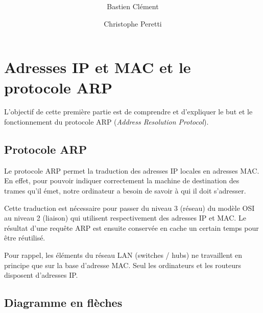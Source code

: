 \documentclass[11pt,a4paper]{article}
\author{Bastien Clément \and Christophe Peretti}
\title{{\normalsize \doccourse} \\ \doctitle }
\begin{document}
\maketitle
\vspace{1em}

\section{Adresses IP et MAC et le protocole ARP}

L'objectif de cette première partie est de comprendre et d'expliquer le but et le fonctionnement du protocole ARP (\textit{Address Resolution Protocol}).

\subsection{Protocole ARP}

Le protocole ARP permet la traduction des adresses IP locales en adresses MAC. En effet, pour pouvoir indiquer correctement la machine de destination des trames qu'il émet, notre ordinateur a besoin de savoir à qui il doit s'adresser.

Cette traduction est nécessaire pour passer du niveau 3 (réseau) du modèle OSI au niveau 2 (liaison) qui utilisent respectivement des adresses IP et MAC. Le résultat d'une requête ARP est ensuite conservée en cache un certain temps pour être réutilisé.

Pour rappel, les éléments du réseau LAN (switches / hubs) ne travaillent en principe que sur la base d'adresse MAC. Seul les ordinateurs et les routeurs disposent d'adresses IP.

\subsection{Diagramme en flèches}

\begin{center}
\end{center}
\end{document}
